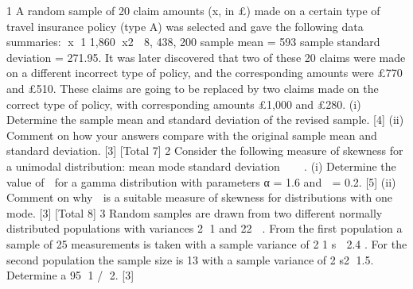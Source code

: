 \documentclass[a4paper,12pt]{article}
\begin{document}
\begin{enumerate}

1 A random sample of 20 claim amounts (x, in £) made on a certain type of travel insurance policy (type A) was selected and gave the following data summaries:
  x 1 1,860
x2  8, 438, 200
sample mean = 593
sample standard deviation = 271.95.
It was later discovered that two of these 20 claims were made on a different incorrect type of policy, and the corresponding amounts were £770 and £510.
These claims are going to be replaced by two claims made on the correct type of policy, with corresponding amounts £1,000 and £280.
(i) Determine the sample mean and standard deviation of the revised sample. [4]
(ii) Comment on how your answers compare with the original sample mean and standard deviation. [3]
[Total 7]
2 Consider the following measure of skewness for a unimodal distribution:
  mean mode
standard deviation

  .
(i) Determine the value of  for a gamma distribution with parameters α = 1.6 and
 = 0.2. [5]
(ii) Comment on why  is a suitable measure of skewness for distributions with one mode. [3]
[Total 8]
3 Random samples are drawn from two different normally distributed populations with
variances 2
1 and 22
 . From the first population a sample of 25 measurements is taken
with a sample variance of 2
1 s  2.4 . For the second population the sample size is 13
with a sample variance of 2
s2 1.5.
Determine a 95%
1 / 2. [3]


\end{enumerate}
\end{document}
